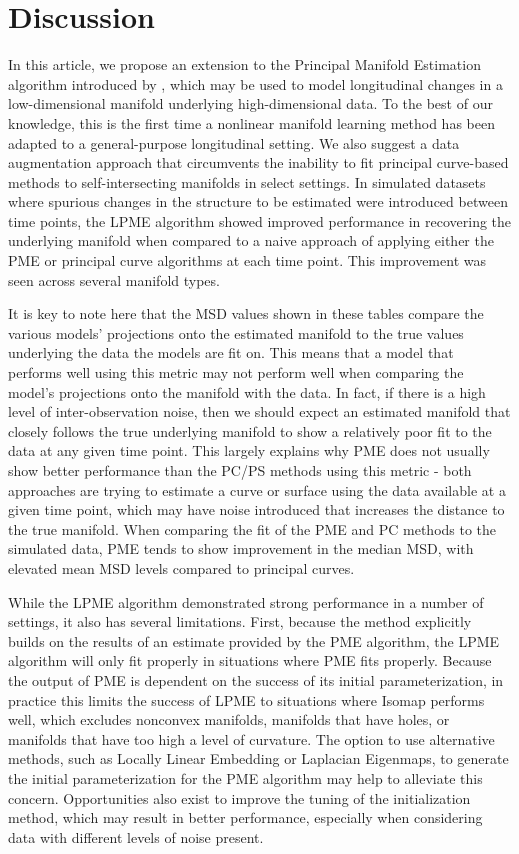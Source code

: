 \documentclass[11pt,reqno]{article}
\theoremstyle{definition}
\begin{document}
\section{Discussion}\label{s:discussion}

In this article, we propose an extension to the Principal Manifold Estimation algorithm introduced by \cite{mengPrincipalManifoldEstimation2021}, which may be used to model longitudinal changes in a low-dimensional manifold underlying high-dimensional data. To the best of our knowledge, this is the first time a nonlinear manifold learning method has been adapted to a general-purpose longitudinal setting. We also suggest a data augmentation approach that circumvents the inability to fit principal curve-based methods to self-intersecting manifolds in select settings. In simulated datasets where spurious changes in the structure to be estimated were introduced between time points, the LPME algorithm showed improved performance in recovering the underlying manifold when compared to a naive approach of applying either the PME or principal curve algorithms at each time point. This improvement was seen across several manifold types.

It is key to note here that the MSD values shown in these tables compare the various models' projections onto the estimated manifold to the true values underlying the data the models are fit on. This means that a model that performs well using this metric may not perform well when comparing the model's projections onto the manifold with the data. In fact, if there is a high level of inter-observation noise, then we should expect an estimated manifold that closely follows the true underlying manifold to show a relatively poor fit to the data at any given time point. This largely explains why PME does not usually show better performance than the PC/PS methods using this metric - both approaches are trying to estimate a curve or surface using the data available at a given time point, which may have noise introduced that increases the distance to the true manifold. When comparing the fit of the PME and PC methods to the simulated data, PME tends to show improvement in the median MSD, with elevated mean MSD levels compared to principal curves.

While the LPME algorithm demonstrated strong performance in a number of settings, it also has several limitations. First, because the method explicitly builds on the results of an estimate provided by the PME algorithm, the LPME algorithm will only fit properly in situations where PME fits properly. Because the output of PME is dependent on the success of its initial parameterization, in practice this limits the success of LPME to situations where Isomap performs well, which excludes nonconvex manifolds, manifolds that have holes, or manifolds that have too high a level of curvature. The option to use alternative methods, such as Locally Linear Embedding or Laplacian Eigenmaps, to generate the initial parameterization for the PME algorithm may help to alleviate this concern. Opportunities also exist to improve the tuning of the initialization method, which may result in better performance, especially when considering data with different levels of noise present.
\end{document}
